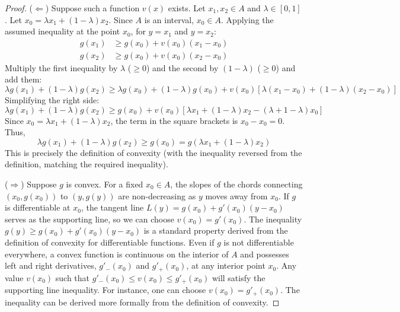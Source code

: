 \documentclass[11pt]{article}
\theoremstyle{definition}
\theoremstyle{remark}
\begin{document}
\begin{proof}
($\Longleftarrow$) Suppose such a function $v(x)$ exists. Let $x_1, x_2 \in A$ and $\lambda \in [0, 1]$. Let $x_0 = \lambda x_1 + (1-\lambda)x_2$. Since $A$ is an interval, $x_0 \in A$. Applying the assumed inequality at the point $x_0$, for $y=x_1$ and $y=x_2$:
\begin{align*} g(x_1) &\ge g(x_0) + v(x_0)(x_1-x_0) \\ g(x_2) &\ge g(x_0) + v(x_0)(x_2-x_0) \end{align*}
Multiply the first inequality by $\lambda$ ($\ge 0$) and the second by $(1-\lambda)$ ($\ge 0$) and add them:
\[ \lambda g(x_1) + (1-\lambda) g(x_2) \ge \lambda g(x_0) + (1-\lambda)g(x_0) + v(x_0) [\lambda(x_1-x_0) + (1-\lambda)(x_2-x_0)] \]
Simplifying the right side:
\[ \lambda g(x_1) + (1-\lambda) g(x_2) \ge g(x_0) + v(x_0) [\lambda x_1 + (1-\lambda)x_2 - (\lambda + 1 - \lambda)x_0] \]
Since $x_0 = \lambda x_1 + (1-\lambda)x_2$, the term in the square brackets is $x_0 - x_0 = 0$. Thus,
\[ \lambda g(x_1) + (1-\lambda) g(x_2) \ge g(x_0) = g(\lambda x_1 + (1-\lambda)x_2) \]
This is precisely the definition of convexity (with the inequality reversed from the definition, matching the required inequality).

($\Longrightarrow$) Suppose $g$ is convex. For a fixed $x_0 \in A$, the slopes of the chords connecting $(x_0, g(x_0))$ to $(y, g(y))$ are non-decreasing as $y$ moves away from $x_0$.
If $g$ is differentiable at $x_0$, the tangent line $L(y) = g(x_0) + g'(x_0)(y-x_0)$ serves as the supporting line, so we can choose $v(x_0) = g'(x_0)$. The inequality $g(y) \ge g(x_0) + g'(x_0)(y-x_0)$ is a standard property derived from the definition of convexity for differentiable functions.
Even if $g$ is not differentiable everywhere, a convex function is continuous on the interior of $A$ and possesses left and right derivatives, $g'_-(x_0)$ and $g'_+(x_0)$, at any interior point $x_0$. Any value $v(x_0)$ such that $g'_-(x_0) \le v(x_0) \le g'_+(x_0)$ will satisfy the supporting line inequality. For instance, one can choose $v(x_0) = g'_+(x_0)$. The inequality can be derived more formally from the definition of convexity.
\end{proof}
\end{document}
